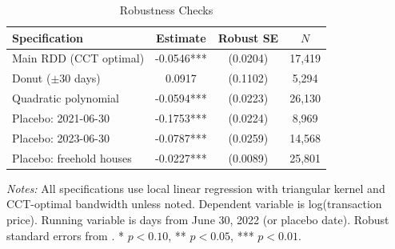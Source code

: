 \begin{table}[H]
\centering
\caption{Robustness Checks}
\label{tab:robustness}
\begin{threeparttable}
\begin{tabular}{lccc}
\toprule
Specification & Estimate & Robust SE & $N$ \\
\midrule
Main RDD (CCT optimal) & -0.0546*** & (0.0204) & 17,419 \\
Donut ($\pm$30 days) & 0.0917 & (0.1102) & 5,294 \\
Quadratic polynomial & -0.0594*** & (0.0223) & 26,130 \\
Placebo: 2021-06-30 & -0.1753*** & (0.0224) & 8,969 \\
Placebo: 2023-06-30 & -0.0787*** & (0.0259) & 14,568 \\
Placebo: freehold houses & -0.0227*** & (0.0089) & 25,801 \\
\bottomrule
\end{tabular}
\begin{tablenotes}[flushleft]
\small
\item \textit{Notes:} All specifications use local linear regression with triangular kernel and CCT-optimal bandwidth unless noted. Dependent variable is log(transaction price). Running variable is days from June 30, 2022 (or placebo date). Robust standard errors from \citet{cattaneo2020}. * $p<0.10$, ** $p<0.05$, *** $p<0.01$.
\end{tablenotes}
\end{threeparttable}
\end{table}
